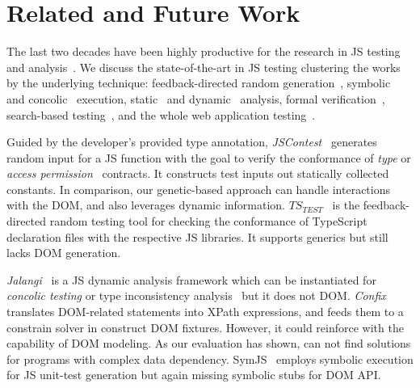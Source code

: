 \section{Related and Future Work}
\label{sec:related.work}

The last two decades have been highly productive for the research in JS testing and analysis~\cite{andreasen2017survey, sun2017analysis, mesbah2015advances}. We discuss the state-of-the-art in JS testing clustering the works by the underlying technique: feedback-directed random generation~\cite{heidegger2010contract,heidegger2012jscontest,kristensen2017type}, symbolic~\cite{tanida2014automatic,saxena2010symbolic} and concolic~\cite{sen2013jalangi,amin:ase15} execution, static~\cite{tajs2009,dom2011} and dynamic~\cite{andreasen2017survey} analysis, formal verification~\cite{gardner2008local,lerner2012modeling,gardner2012towards}, search-based testing~\cite{alshraideh2008complete}, and the whole web application testing~\cite{alshahwan2011automated,mesbah2012invariant,milani2014leveraging}.

Guided by the developer's provided type annotation, \emph{JSContest}~\cite{heidegger2010contract} generates random input for a JS function with the goal to verify the conformance of \emph{type} or \emph{access permission}~\cite{heidegger2012jscontest} contracts. It constructs test inputs out statically collected constants. In comparison, our genetic-based approach can handle interactions with the DOM, and also leverages dynamic information. $TS_{TEST}$~\cite{kristensen2017type} is the feedback-directed random testing tool for checking the conformance of TypeScript declaration files with the respective JS libraries. It supports generics but still lacks DOM generation.


\emph{Jalangi}~\cite{sen2013jalangi} is a JS dynamic analysis framework which can be instantiated for \emph{concolic testing} or {type inconsistency} analysis~\cite{pradel2015typedevil} but it does not DOM. \emph{Confix}~\cite{amin:ase15} translates DOM-related statements into XPath expressions, and feeds them to a constrain solver in construct DOM fixtures. However, it could reinforce \Jalangi with the capability of DOM modeling. As our evaluation has shown, \Confix can not find solutions for programs with complex data dependency. SymJS~\cite{tanida2014automatic} employs symbolic execution for JS unit-test generation but again missing symbolic stubs for DOM API.

